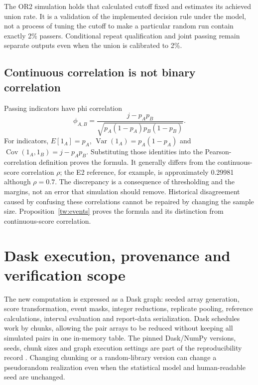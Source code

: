 The OR2 simulation holds that calculated cutoff fixed and estimates its
achieved union rate. It is a validation of the implemented decision rule under
the model, not a process of tuning the cutoff to make a particular random run
contain exactly 2\% passers. Conditional repeat qualification and joint passing
remain separate outputs even when the union is calibrated to 2\%.



\section{Continuous correlation is not binary correlation}

Passing indicators have phi correlation
\begin{equation}
 \phi_{A,B}=\frac{j-p_Ap_B}
 {\sqrt{p_A(1-p_A)p_B(1-p_B)}}.
 \label{eq:towers-phi}
\end{equation}
For indicators, \(E[1_A]=p_A\), \(\operatorname{Var}(1_A)=p_A(1-p_A)\)
and \(\operatorname{Cov}(1_A,1_B)=j-p_Ap_B\). Substituting those identities
into the Pearson-correlation definition proves the formula. It generally
differs from the continuous-score correlation \(\rho\); the E2 reference,
for example, is approximately 0.29981 although \(\rho=0.7\). The discrepancy
is a consequence of thresholding and the margins, not an error that simulation
should remove. Historical disagreement caused by confusing these correlations
cannot be repaired by changing the sample size.
Proposition~\ref{tw:events} proves the formula and its distinction from
continuous-score correlation.



\chapter{Dask execution, provenance and verification scope}

The new computation is expressed as a Dask graph: seeded array generation,
score transformation, event masks, integer reductions, replicate pooling,
reference calculations, interval evaluation and report-data serialization.
Dask schedules work by chunks, allowing the pair arrays to be reduced without
keeping all simulated pairs in one in-memory table. The pinned Dask/NumPy
versions, seeds, chunk sizes and graph execution settings are part of the
reproducibility record \citep{daskDelayed,daskArray}. Changing chunking or a
random-library version can change a pseudorandom realization even when the
statistical model and human-readable seed are unchanged.

